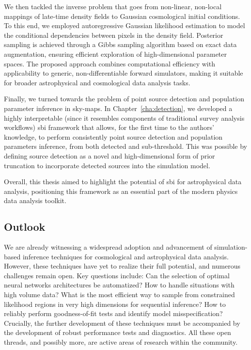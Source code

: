 We then tackled the inverse problem that goes from non-linear, non-local mappings of late-time density fields to Gaussian cosmological initial conditions. To this end, we employed autoregressive Gaussian likelihood estimation to model the conditional dependencies between pixels in the density field. Posterior sampling is achieved through a Gibbs sampling algorithm based on exact data augmentation, ensuring efficient exploration of high-dimensional parameter spaces. The proposed approach combines computational efficiency with applicability to generic, non-differentiable forward simulators, making it suitable for broader astrophysical and cosmological data analysis tasks.

Finally, we turned towards the problem of point source detection and population parameter inference in sky-maps. In Chapter~\ref{cha:detection}, we developed a highly interpretable (since it resembles components of traditional survey analysis workflows) \gls*{sbi} framework that allows, for the first time to the authors' knowledge, to perform consistently point source detection and population parameters inference, from both detected and sub-threshold. This was possible by defining source detection as a novel and high-dimensional form of prior truncation to incorporate detected sources into the simulation model.

Overall, this thesis aimed to highlight the potential of \gls*{sbi} for astrophysical data analysis, positioning this framework as an essential part of the modern physics data analysis toolkit.


\subsection*{Outlook}

We are already witnessing a widespread adoption and advancement of simulation-based inference techniques for cosmological and astrophysical data analysis. However, these techniques have yet to realize their full potential, and numerous challenges remain open. Key questions include: Can the selection of optimal neural networks architectures be automatized? How to handle situations with high volume data? What is the most efficient way to sample from constrained likelihood regions in very high dimensions for sequential inference? How to reliably perform goodness-of-fit tests and identify model misspecification? Crucially, the further development of these techniques must be accompanied by the development of robust performance tests and diagnostics. All these open threads, and possibly more, are active areas of research within the community.

